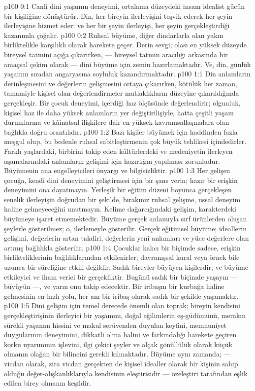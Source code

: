 \vs p100 0:1 Canli dini yaşamın deneyimi, ortalama düzeydeki insanı idealist gücün bir kişiliğine dönüştürür. Din, her bireyin ilerleyişini teşvik ederek her şeyin ilerleyişine hizmet eder; ve her bir şeyin ilerleyişi, her şeyin gerçekleştirdiği kazanımla çoğalır.
\vs p100 0:2 Ruhsal büyüme, diğer dindarlarla olan yakın birliktelikle karşılıklı olarak harekete geçer. Derin sevgi; olası en yüksek düzeyde bireysel tatmini açığa çıkarırken, --- bireysel tatmin aracılığı arkasında bir amaçsal çekim olarak --- dini büyüme için zemin hazırlamaktadır. Ve, din, günlük yaşamın sıradan angaryasına soyluluk kazandırmaktadır.
\vs p100 1:1 Din anlamların derinleşmesini ve değerlerin gelişmesini ortaya çıkarırken, kötülük her zaman, tamamiyle kişisel olan değerlendirmeler mutlaklıkların düzeyine çıkarıldığında gerçekleşir. Bir çocuk deneyimi, içerdiği haz ölçüsünde değerlendirir; olgunluk, kişisel haz ile daha yüksek anlamların yer değiştirilişiyle, hatta çeşitli yaşam durumlarına ve kâinatsal ilişkilere dair en yüksek kavramsallaşmalara olan bağlıkla doğru orantılıdır.
\vs p100 1:2 Bazı kişiler büyümek için haddinden fazla meşgul olup, bu bedenle ruhsal sabitleştirmenin çok büyük tehlikesi içindedirler. Farklı yaşlardaki, birbirini takip eden kültürlerdeki ve medeniyetin ilerleyen aşamalarındaki anlamların gelişimi için hazırlığın yapılması zorunludur. Büyümenin ana engelleyicileri önyargı ve bilgisizliktir.
\vs p100 1:3 Her gelişen çocuğa, kendi dini deneyimini geliştirmesi için bir şans verin; hazır bir erişkin deneyimini ona dayatmayın. Yerleşik bir eğitim düzeni boyunca gerçekleşen senelik ilerleyişin doğrudan bir şekilde, bırakınız ruhsal gelişme, ussal deneyim haline gelmeyeceğini unutmayın. Kelime dağarcığındaki gelişim, karakterdeki büyümeye işaret etmemektedir. Büyüme gerçek anlamıyla sırf ürünlerden oluşan şeylerle gösterilmez; o, ilerlemeyle gösterilir. Gerçek eğitimsel büyüme; ideallerin gelişimi, değerlerin artan takdiri, değerlerin yeni anlamları ve yüce değerlere olan artmış bağlılıkla gösterilir.
\vs p100 1:4 Çocuklar kalıcı bir biçimde sadece, erişkin birlikteliklerinin bağlılıklarından etkilenirler; davranışsal kural veya örnek bile uzunca bir süreliğine etkili değildir. Sadık bireyler büyüyen kişilerdir; ve büyüme etkileyici ve iham verici bir gerçekliktir. Bugünü sadık bir biçimde yaşayın --- büyüyün ---, ve yarın onu takip edecektir. Bir iribaşın bir kurbağa haline gelmesinin en hızlı yolu, her anı bir iribaş olarak sadık bir şekilde yaşamaktır.
\vs p100 1:5 Dini gelişim için temel derecede önemli olan toprak; bireyin kendisini gerçekleştirişinin ilerleyici bir yaşamını, doğal eğilimlerin eş\hyp{}güdümünü, merakın sürekli yaşanan hissini ve makul serüvenden duyulan keyfini, memnuniyet duygularının deneyimini, dikkatli olma halini ve farkındalığı harekete geçiren korku uyarımının işlevini, ilgi çekici şeyler ve alçak gönüllülük olarak küçük olmanın olağan bir bilincini gerekli kılmaktadır. Büyüme aynı zamanda; --- vicdan olarak, zira vicdan gerçekten de kişisel idealler olarak bir kişinin sahip olduğu değer\hyp{}alışkanlıklarıyla kendisinin eleştirisidir --- özeleştiri tarafından eşlik edilen birey olmanın keşfidir.
